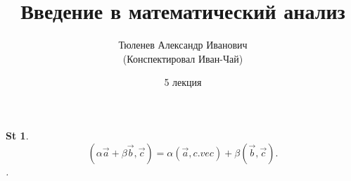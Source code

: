 \documentclass[a5paper, 10pt]{article}
\theoremstyle{plain}
\newtheorem*{statement}{St}
\begin{document}
	\author{Тюленев Александр Иванович\\(Конспектировал Иван-Чай)}
	\date{5 лекция}
	\title{Введение в математический анализ}

	\linespread{1.4}
	\selectfont

	\maketitle
	\newpage

	\tableofcontents

    \begin{statement}
        \[
            (\alpha \vec{a} + \beta \vec{b}, \vec{c}) = \alpha (\vec{a}, c.vec) + \beta( \vec{b}, \vec{c})
        .\].
    \end{statement}
\end{document}
